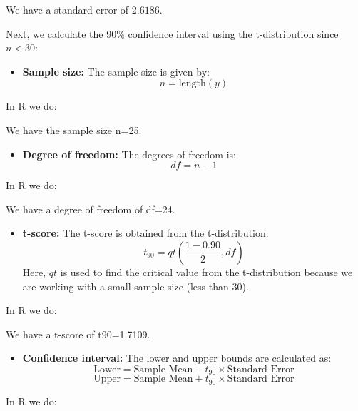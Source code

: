 \documentclass[12pt,letterpaper]{article}
\begin{document}
\begin{enumerate}
		We have a standard error of \(2.6186\).
		
		Next, we calculate the 90\% confidence interval using the t-distribution since \(n < 30\):
		
		\begin{itemize}
			\item \textbf{Sample size:} The sample size is given by:
			\[
			n = \text{length}(y)
			\]
		\end{itemize}
		
		In R we do:
		
		
		We have the sample size n=25.
		
		\begin{itemize}
			\item \textbf{Degree of freedom:} The degrees of freedom is:
			\[
			df = n - 1
			\]
		\end{itemize}
		
		In R we do:
		
		
		We have a degree of freedom of df=24.
		\begin{itemize}
			\item \textbf{t-score:} The t-score is obtained from the t-distribution:
			\[
			t_{90} = qt\left(\frac{1 - 0.90}{2}, df\right)
			\]
			Here, \( qt \) is used to find the critical value from the t-distribution because we are working with a small sample size (less than 30). 
		\end{itemize}
		
		In R we do:
		
		
		We have a t-score of t90=1.7109.
		
		\begin{itemize}
			\item \textbf{Confidence interval:} The lower and upper bounds are calculated as:
			\[
			\text{Lower} = \text{Sample Mean} - t_{90} \times \text{Standard Error}
			\]
			\[
			\text{Upper} = \text{Sample Mean} + t_{90} \times \text{Standard Error}
			\]
		\end{itemize}
		
		In R we do:
		
		

\end{enumerate}
\end{document}
